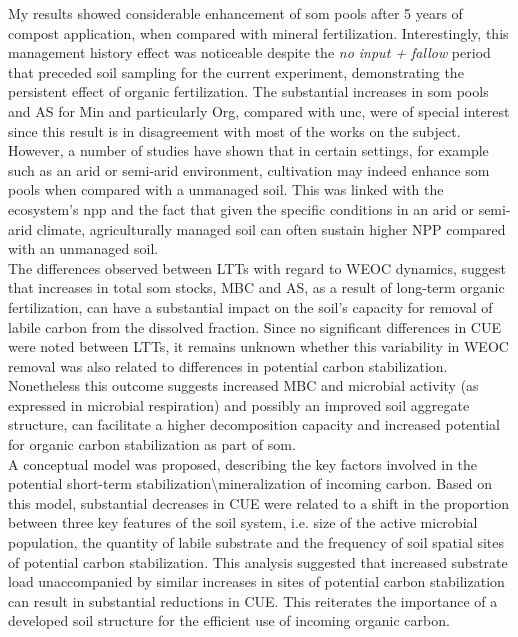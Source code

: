 	My results showed considerable enhancement of \gls{som} pools after 5 years of compost application, when compared with mineral fertilization. Interestingly, this management history effect was noticeable despite the \textit{no input + fallow} period that preceded soil sampling for the current experiment, demonstrating the persistent effect of organic fertilization. The substantial increases in \gls{som} pools and AS for Min and particularly Org, compared with \gls{unc}, were of special interest since this result is in disagreement with most  of the works on the subject. However, a number of studies have shown that in certain settings, for example such as an arid or semi-arid environment, cultivation may indeed enhance \gls{som} pools when compared with a unmanaged soil. This was linked with the ecosystem's \gls{npp} and the fact that given the specific conditions in an arid or semi-arid climate, agriculturally managed soil can often sustain higher NPP compared with an unmanaged soil.\\
	The differences observed between LTTs with regard to WEOC dynamics, suggest that increases in total \gls{som} stocks, MBC and AS, as a result of long-term organic fertilization, can have a substantial impact on the soil's capacity for removal of labile carbon from the dissolved fraction. Since no significant differences in CUE were noted between LTTs, it remains unknown whether this variability in WEOC removal was also related to differences in potential carbon stabilization. Nonetheless this outcome suggests increased MBC and microbial activity (as expressed in microbial respiration) and possibly an improved soil aggregate structure, can facilitate a higher decomposition capacity and increased potential for organic carbon stabilization as part of \gls{som}.\\
	A conceptual model was proposed, describing the key factors involved in the potential short-term stabilization\textbackslash mineralization of incoming carbon. Based on this model, substantial decreases in CUE were related to a shift in the proportion between three key features of the soil system, i.e. size of the active microbial population, the quantity of labile substrate and the frequency of soil spatial sites of potential carbon stabilization. This analysis suggested that increased substrate load unaccompanied by similar increases in sites of potential carbon stabilization can result in substantial reductions in CUE. This reiterates the importance of a developed soil structure for the efficient use of incoming organic carbon.\\
